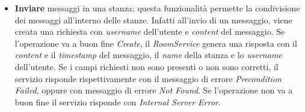 \begin{itemize}
%
    \item \textbf{Inviare} messaggi in una stanza: questa funzionalità permette la condivisione dei messaggi all'interno delle stanze. Infatti all'invio di un messaggio, viene creata una richiesta con \textit{username} dell'utente e \textit{content} del messaggio. Se l'operazione va a buon fine \textit{Create}, il \textit{RoomService} genera una risposta con il \textit{content} e il \textit{timestamp} del messaggio, il \textit{name} della stanza e lo \textit{username} dell'utente. Se i campi richiesti non sono presenti o non sono corretti, il servizio risponde rispettivamente con il messaggio di errore \textit{Precondition Failed}, oppure con messaggio di errore \textit{Not Found}. Se l'operazione non va a buon fine il servizio risponde con \textit{Internal Server Error}.
%
\end{itemize}

